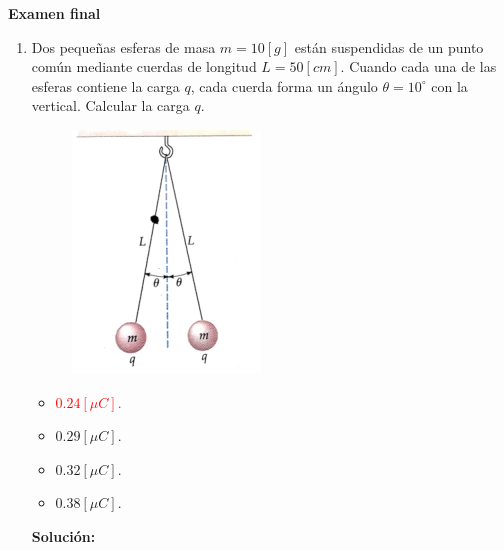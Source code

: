 \documentclass[letter,11pt]{article}
\begin{document}
\begin{center}
    {\Large \bf{Examen final}}
\end{center}

\noindent{}

\vspace{0.5cm}

\begin{enumerate}
\item Dos pequeñas esferas de masa $m = 10 [g]$ están suspendidas de un punto
común mediante cuerdas de longitud $L = 50 [cm]$. Cuando cada una de las esferas
contiene la carga $q$, cada cuerda forma un ángulo $\theta = 10^\circ$ con la
vertical. Calcular la carga $q$.

\begin{figure}[!h]
\centering
\includegraphics[scale=2.20]{resources/q1.eps}
\end{figure}

\begin{itemize}
    \item \textcolor{red}{$0.24 [\mu C]$.}
    \item $0.29 [\mu C]$.
    \item $0.32 [\mu C]$.
    \item $0.38 [\mu C]$.
\end{itemize}

\textbf{Solución:}


\end{enumerate}
\end{document}
